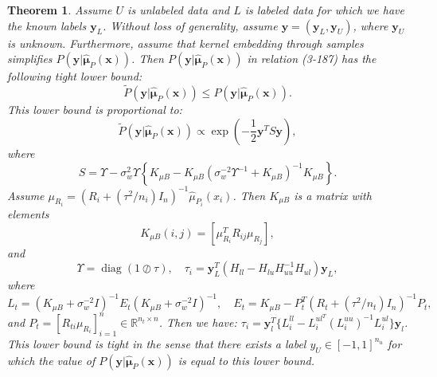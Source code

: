 \documentclass[12pt]{article}
\newtheorem{theorem}{Theorem}[section]
\DeclareMathOperator{\diag}{diag}
\begin{document}
	\begin{theorem}
		Assume $U$ is unlabeled data and $L$ is labeled data for which we have the known labels $\mathbf{y}_L$. Without loss of generality, assume $\mathbf{y} = (\mathbf{y}_L, \mathbf{y}_U)$, where $\mathbf{y}_U$ is unknown. Furthermore, assume that kernel embedding through samples simplifies $P(\mathbf{y}|\hat{\boldsymbol{\mu}}_P(\mathbf{x}))$. Then $P(\mathbf{y}|\hat{\boldsymbol{\mu}}_P(\mathbf{x}))$ in relation (3-187) has the following tight lower bound:
		\begin{equation}
			\tilde{P}(\mathbf{y}|\hat{\boldsymbol{\mu}}_P(\mathbf{x})) \le P(\mathbf{y}|\hat{\boldsymbol{\mu}}_P(\mathbf{x})).
		\end{equation}
		This lower bound is proportional to:
		\begin{equation}
			\tilde{P}(\mathbf{y}|\hat{\boldsymbol{\mu}}_P(\mathbf{x})) \propto \exp\left( -\frac{1}{2} \mathbf{y}^T S \mathbf{y} \right),
		\end{equation}
		where
		\begin{equation}
			S = \Upsilon - \sigma_w^2 \Upsilon \left\{ K_{\mu B} - K_{\mu B} \left( \sigma_w^{-2} \Upsilon^{-1} + K_{\mu B} \right)^{-1} K_{\mu B} \right\}.
		\end{equation}
		Assume $\mu_{R_i} = (R_i + (\tau^2 / n_i) I_n)^{-1} \hat{\mu}_{P_i}(x_i)$. Then $K_{\mu B}$ is a matrix with elements
		\begin{equation}
			K_{\mu B}(i, j) = [\mu_{R_i}^T R_{ij} \mu_{R_j}],
		\end{equation}
		and
		\begin{equation}
			\Upsilon = \diag(1 \oslash \tau), \quad \tau_i = \mathbf{y}_L^T (H_{ll} - H_{lu} H_{uu}^{-1} H_{ul}) \mathbf{y}_L,
		\end{equation}
		where
		\begin{equation}
			L_t = (K_{\mu B} + \sigma_w^{-2} I)^{-1} E_t (K_{\mu B} + \sigma_w^{-2} I)^{-1}, \quad E_t = K_{\mu B} - P_t^T (R_t + (\tau^2 / n_t) I_n)^{-1} P_t,
		\end{equation}
		and $P_t = [R_{ti} \mu_{R_i}]_{i=1}^{n} \in \mathbb{R}^{n_t \times n}$. Then we have: $\tau_i = \mathbf{y}_l^T \{ L_i^{ll} - L_i^{ul^T} (L_i^{uu})^{-1} L_i^{ul} \} \mathbf{y}_l$. This lower bound is tight in the sense that there exists a label $y_U \in [-1, 1]^{n_u}$ for which the value of $P(\mathbf{y}|\hat{\boldsymbol{\mu}}_P(\mathbf{x}))$ is equal to this lower bound.
	\end{theorem}
	
\end{document}
